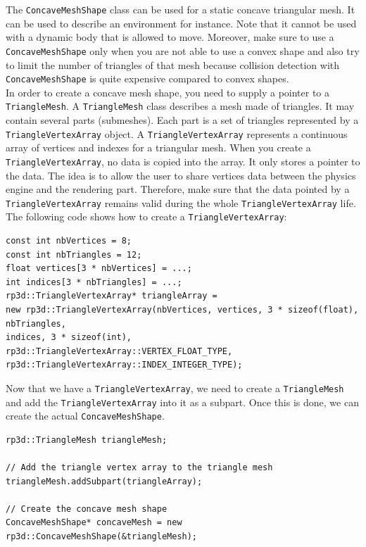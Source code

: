 \documentclass[a4paper,12pt]{article}
\begin{document}
  The \texttt{ConcaveMeshShape} class can be used for a static concave triangular mesh. It can be used to describe an environment for
  instance. Note that it cannot be used with a dynamic body that is allowed to move. Moreover, make sure to use a \texttt{ConcaveMeshShape} only
  when you are not able to use a convex shape and also try to limit the number of triangles of that mesh because collision detection
  with \texttt{ConcaveMeshShape} is quite expensive compared to convex shapes. \\

  In order to create a concave mesh shape, you need to supply a pointer to a \texttt{TriangleMesh}. A \texttt{TriangleMesh} class
  describes a mesh made of triangles. It may contain several parts (submeshes). Each part is a set of
  triangles represented by a \texttt{TriangleVertexArray} object. A \texttt{TriangleVertexArray} represents
  a continuous array of vertices and indexes for a triangular mesh. When you create a \texttt{TriangleVertex\allowbreak Array}, no data is copied
  into the array. It only stores a pointer to the data. The idea is to allow the user to share vertices data between the physics engine and the rendering
  part. Therefore, make sure that the data pointed by a \texttt{TriangleVertexArray} remains valid during the whole \texttt{TriangleVertexArray} life.
  \\

  The following code shows how to create a \texttt{TriangleVertexArray}: \\

  \begin{lstlisting}
const int nbVertices = 8;
const int nbTriangles = 12;
float vertices[3 * nbVertices] = ...;
int indices[3 * nbTriangles] = ...;
rp3d::TriangleVertexArray* triangleArray =
new rp3d::TriangleVertexArray(nbVertices, vertices, 3 * sizeof(float), nbTriangles,
indices, 3 * sizeof(int),
rp3d::TriangleVertexArray::VERTEX_FLOAT_TYPE,
rp3d::TriangleVertexArray::INDEX_INTEGER_TYPE);
  \end{lstlisting}

  \vspace{0.6cm}

  Now that we have a \texttt{TriangleVertexArray}, we need to create a \texttt{TriangleMesh} and add the \texttt{TriangleVertexArray}
  into it as a subpart. Once this is done, we can create the actual \texttt{ConcaveMeshShape}. \\

  \begin{lstlisting}
rp3d::TriangleMesh triangleMesh;

// Add the triangle vertex array to the triangle mesh
triangleMesh.addSubpart(triangleArray);

// Create the concave mesh shape
ConcaveMeshShape* concaveMesh = new rp3d::ConcaveMeshShape(&triangleMesh);
  \end{lstlisting}
\end{document}
